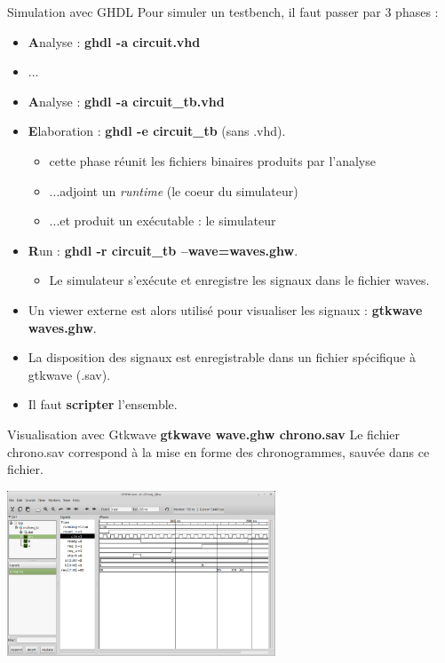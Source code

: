 \documentclass[xcolor=table]{beamer} %
\begin{document}
\begin{frame}{Simulation avec GHDL}
  Pour simuler un testbench, il faut passer par 3 phases :
  \begin{itemize}
    \item \textbf{A}nalyse : \textbf{ ghdl -a circuit.vhd}
    \item ...
    \item \textbf{A}nalyse : \textbf{ghdl -a circuit\_tb.vhd}
    \item \textbf{E}laboration : \textbf{ghdl -e circuit\_tb} (sans .vhd).
    \begin{itemize}
      \item cette phase réunit les fichiers binaires produits par l'analyse
      \item ...adjoint un {\it runtime} (le coeur du simulateur)
      \item ...et produit un exécutable : le simulateur
    \end{itemize}
    \item \textbf{R}un : \textbf{ghdl -r circuit\_tb --wave=waves.ghw}.
    \begin{itemize}
      \item Le simulateur s'exécute et enregistre les signaux dans le fichier waves.
    \end{itemize}
    \item Un viewer externe est alors utilisé pour visualiser les signaux : \textbf{gtkwave waves.ghw}.
    \item La disposition des signaux est enregistrable dans un fichier spécifique à gtkwave (.sav).
    \item Il faut \textbf{scripter} l'ensemble.
  \end{itemize}
\end{frame}

\begin{frame}{Visualisation avec Gtkwave}
  \textbf{gtkwave wave.ghw chrono.sav}
  Le fichier chrono.sav correspond à la mise en forme des chronogrammes, sauvée dans ce fichier.
  \begin{center}
  \begin{minipage}[t]{8cm}
   \centering
   \includegraphics[width=8cm]{./figures/gtkwave.png}
  \end{minipage}
  \end{center}
\end{frame}
\end{document}
